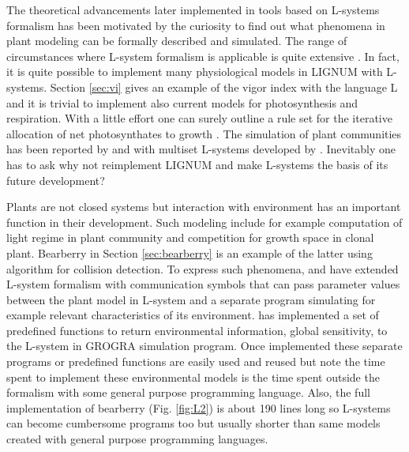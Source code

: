 The  theoretical  advancements later  implemented  in  tools based  on
L-systems formalism  has been motivated  by the curiosity to  find out
what  phenomena  in  plant  modeling  can be  formally  described  and
simulated.   The range  of circumstances  where L-system  formalism is
applicable  is quite extensive  \citep{pp:99}.  In  fact, it  is quite
possible  to  implement  many  physiological  models  in  LIGNUM  with
L-systems.  Section  \ref{sec:vi} gives an example of  the vigor index
with the language L and it is trivial to implement also current models
for  photosynthesis and  respiration.  With  a little  effort  one can
surely  outline  a  rule  set  for the  iterative  allocation  of  net
photosynthates    to    growth   \citep{perttunen:96,    perttunen:98,
  perttunen:01}.   The  simulation   of  plant  communities  has  been
reported by \citet{kurth:99} and  with multiset L-systems developed by
\citet{lane:02}.  Inevitably one has to ask why not reimplement LIGNUM
and make L-systems the basis of its future development?

Plants are not closed systems  but interaction with environment has an
important function  in their  development.  Such modeling  include for
example computation of light regime in plant community and competition
for   growth   space   in   clonal  plant.    Bearberry   in   Section
\ref{sec:bearberry} is  an example of  the latter using  algorithm for
collision detection.   To express such  phenomena, \citet{mech:97} and
\citet{mech:96}  have extended  L-system formalism  with communication
symbols  that can  pass parameter  values between  the plant  model in
L-system  and  a  separate  program simulating  for  example  relevant
characteristics of its  environment.  \citet{kurth:94} has implemented
a  set of  predefined functions  to return  environmental information,
global  sensitivity, to  the  L-system in  GROGRA simulation  program.
Once implemented  these separate programs or  predefined functions are
easily  used and reused  but note  the time  spent to  implement these
environmental models is the time spent outside the formalism with some
general purpose  programming language.  Also,  the full implementation
of bearberry (Fig. \ref{fig:L2})  is about 190 lines long  so L-systems can
become cumbersome  programs too but  usually shorter than  same models
created with general purpose programming languages.
 
